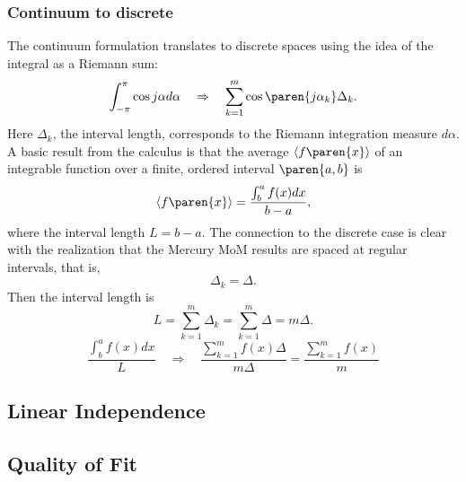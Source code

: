 \subsubsection{Continuum to discrete}
The continuum formulation translates to discrete spaces using the idea of the integral as a Riemann sum: 
\begin{equation}
	\int_{-\pi}^{\pi}{ \cos j\alpha d\alpha } \quad \Rightarrow \quad \sum_{k=1}^{m} \cos \paren{j\alpha_{k}} \Delta_{k}.
\end{equation}
Here $\Delta_{k}$, the interval length, corresponds to the Riemann integration measure $d\alpha$. A basic result from the calculus is that the average $\langle f\paren{x} \rangle$ of an integrable function over a finite, ordered interval $\paren{a,b}$ is
\begin{equation}
	\langle f\paren{x} \rangle = \frac{\int_{b}^{a} f(x) dx }{b-a},
\end{equation}
where the interval length $L=b-a$. The connection to the discrete case is clear with the realization that the Mercury MoM results are spaced at regular intervals, that is,
$$ \Delta_{k} = \Delta.$$ 
Then the interval length is
\begin{equation}
	L = \sum_{k=1}^{m} \Delta_{k} = \sum_{k=1}^{m}  \Delta = m \Delta.
\end{equation}
\begin{equation}
	\frac{\int_{b}^{a} f(x) dx }{L} \quad \Rightarrow \quad \frac{\sum_{k=1}^{m} f(x) \Delta}{m \Delta} =  \frac{\sum_{k=1}^{m} f(x)}{m}
\end{equation}

\subsection{Linear Independence}
	
\subsection{Quality of Fit}

\endinput  %
